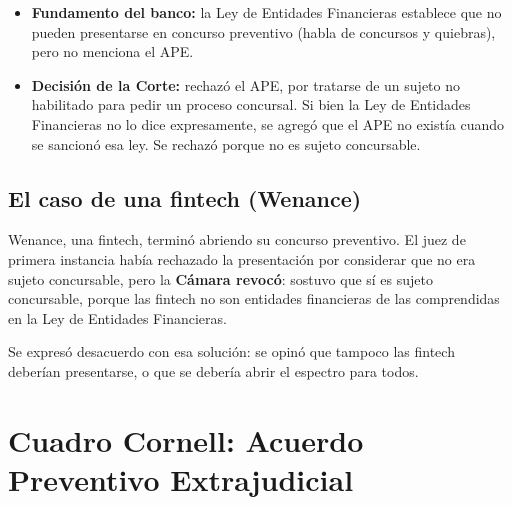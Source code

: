 \documentclass[12pt,oneside]{book}
\begin{document}
\begin{itemize}
    \item \textbf{Fundamento del banco:} la Ley de Entidades Financieras establece que no pueden presentarse en concurso preventivo (habla de concursos y quiebras), pero no menciona el APE.
    \item \textbf{Decisión de la Corte:} rechazó el APE, por tratarse de un sujeto no habilitado para pedir un proceso concursal. Si bien la Ley de Entidades Financieras no lo dice expresamente, se agregó que el APE no existía cuando se sancionó esa ley. Se rechazó porque no es sujeto concursable.
\end{itemize}

\subsection{El caso de una fintech (Wenance)}

Wenance, una fintech, terminó abriendo su concurso preventivo. El juez de primera instancia había rechazado la presentación por considerar que no era sujeto concursable, pero la \textbf{Cámara revocó}: sostuvo que sí es sujeto concursable, porque las fintech no son entidades financieras de las comprendidas en la Ley de Entidades Financieras.

\begin{note}
Se expresó desacuerdo con esa solución: se opinó que tampoco las fintech deberían presentarse, o que se debería abrir el espectro para todos.
\end{note}

\section{Cuadro Cornell: Acuerdo Preventivo Extrajudicial}
\end{document}
